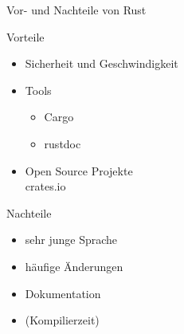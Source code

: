 \documentclass{beamer}
\begin{document}
\begin{frame}{Vor- und Nachteile von Rust}
\pause
\begin{minipage}[t]{.46\textwidth}
Vorteile
\begin{itemize}
  \item Sicherheit und Geschwindigkeit
  \item Tools
  \begin{itemize}
    \item Cargo
    \item rustdoc
  \end{itemize}
  \item Open Source Projekte \\ crates.io
\end{itemize}
\end{minipage}
\hfill
\begin{minipage}[t]{.46\textwidth}
\pause
Nachteile
\begin{itemize}
  \item sehr junge Sprache
  \item häufige Änderungen 
  \item Dokumentation   
  \item (Kompilierzeit)
\end{itemize}
\end{minipage}
\end{frame}

%
\end{document}
